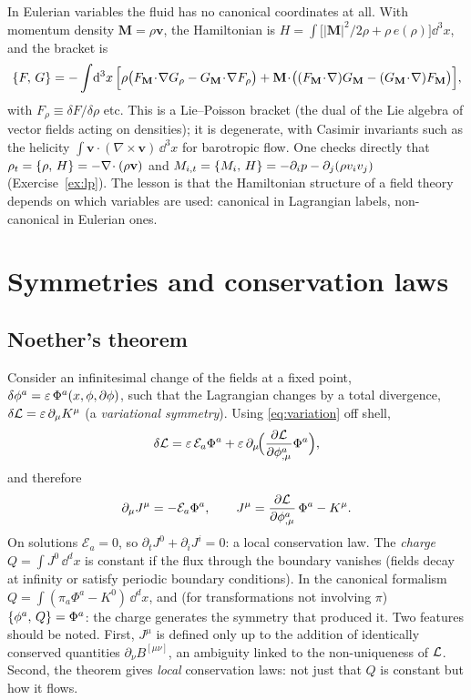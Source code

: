 In Eulerian variables the fluid has no canonical coordinates at all. With
momentum density $\mathbf{M}=\rho\mathbf{v}$, the Hamiltonian is
$H=\int\big[|\mathbf{M}|^2/2\rho+\rho\,e(\rho)\big]\dd^3x$, and the bracket is
\begin{equation}
  \PB{F}{G}=-\int\!\dd^3x\,\Big[\rho\big(F_{\mathbf M}\!\cdot\!\nabla G_\rho-G_{\mathbf M}\!\cdot\!\nabla F_\rho\big)
  +\mathbf{M}\!\cdot\!\big((F_{\mathbf M}\!\cdot\!\nabla)G_{\mathbf M}-(G_{\mathbf M}\!\cdot\!\nabla)F_{\mathbf M}\big)\Big],
  \label{eq:lie-poisson}
\end{equation}
with $F_\rho\equiv\delta F/\delta\rho$ etc. This is a Lie--Poisson bracket (the
dual of the Lie algebra of vector fields acting on densities); it is degenerate,
with Casimir invariants such as the helicity $\int\mathbf{v}\!\cdot\!(\nabla\times\mathbf{v})\,\dd^3x$
for barotropic flow. One checks directly that
$\rho_t=\{\rho,\,H\}=-\nabla\!\cdot(\rho\mathbf{v})$ and
$M_{i,t}=\{M_i,\,H\}=-\partial_ip-\partial_j(\rho v_iv_j)$ (Exercise~\ref{ex:lp}).
The lesson is that the Hamiltonian structure of a field theory depends on which
variables are used: canonical in Lagrangian labels, non-canonical in Eulerian
ones.

\section{Symmetries and conservation laws}
\label{sec:noether}

\subsection{Noether's theorem}

Consider an infinitesimal change of the fields at a fixed point,
$\delta\phi^a=\varepsilon\,\Phi^a(x,\phi,\partial\phi)$, such that the Lagrangian changes
by a total divergence, $\delta\mathcal{L}=\varepsilon\,\partial_\mu K^\mu$ (a \emph{variational
symmetry}). Using \eqref{eq:variation} off shell,
\[
  \delta\mathcal{L}=\varepsilon\,\mathcal{E}_a\Phi^a+\varepsilon\,\partial_\mu\!\Big(\frac{\partial \mathcal{L}}{\partial \phi^a_{,\mu}}\Phi^a\Big),
\]
and therefore
\begin{equation}
  \partial_\mu J^\mu=-\mathcal{E}_a\Phi^a,\qquad
  J^\mu=\frac{\partial \mathcal{L}}{\partial \phi^a_{,\mu}}\,\Phi^a-K^\mu .
  \label{eq:noether}
\end{equation}
On solutions $\mathcal{E}_a=0$, so $\partial_tJ^0+\partial_iJ^i=0$: a local conservation
law. The \emph{charge} $Q=\int J^0\,\dd^dx$ is constant if the flux through the boundary
vanishes (fields decay at infinity or satisfy periodic boundary conditions).
In the canonical formalism $Q=\int(\pi_a\Phi^a-K^0)\,\dd^dx$, and (for transformations
not involving $\pi$) $\{\phi^a,\,Q\}=\Phi^a$: the charge generates the symmetry that
produced it. Two features should be noted. First, $J^\mu$ is defined only up
to the addition of identically conserved quantities
$\partial_\nu B^{[\mu\nu]}$, an ambiguity linked to the non-uniqueness of $\mathcal{L}$.
Second, the theorem gives \emph{local} conservation laws: not just that $Q$ is
constant but how it flows.

